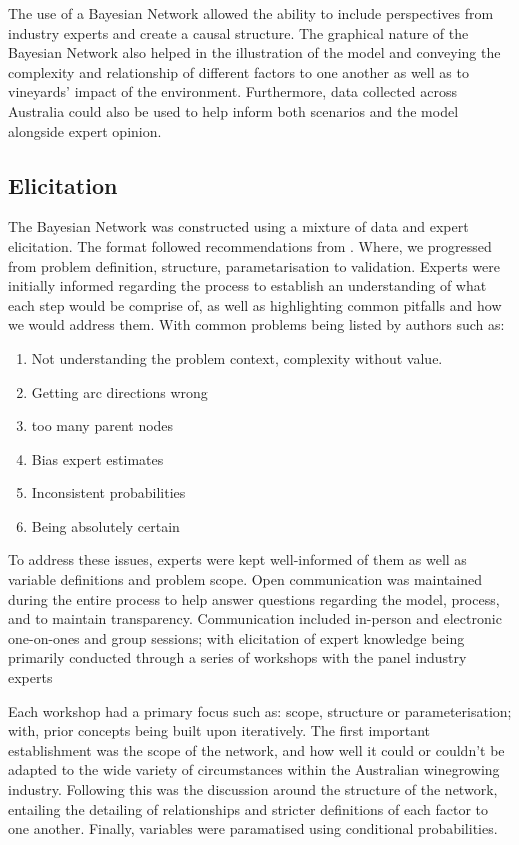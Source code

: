 The use of a Bayesian Network allowed the ability to include perspectives from industry experts and create a causal structure. The graphical nature of the Bayesian Network also helped in the illustration of the model and conveying the complexity and relationship of different factors to one another as well as to vineyards' impact of the environment. Furthermore, data collected across Australia could also be used to help inform both scenarios and the model alongside expert opinion.

\subsection{Elicitation}

The Bayesian Network was constructed using a mixture of data and expert elicitation. The format followed recommendations from \cite{korbBayesianArtificialIntelligence2011,pitchforthProposedValidationFramework2013}. Where, we progressed from problem definition, structure, parametarisation to validation. Experts were initially informed regarding the process to establish an understanding of what each step would be comprise of, as well as highlighting common pitfalls and how we would address them. With common problems being listed by authors such as:
\begin{enumerate}
        \item Not understanding the problem context, complexity without value.
        \item Getting arc directions wrong
        \item too many parent nodes
        \item Bias expert estimates
        \item Inconsistent probabilities
        \item Being absolutely certain
\end{enumerate}
To address these issues, experts were kept well-informed of them as well as variable definitions and problem scope. Open communication was maintained during the entire process to help answer questions regarding the model, process, and to maintain transparency. Communication included in-person and electronic one-on-ones and group sessions; with elicitation of expert knowledge being primarily conducted through a series of workshops with the panel industry experts

Each workshop had a primary focus such as: scope, structure or parameterisation; with, prior concepts being built upon iteratively. The first important establishment was the scope of the network, and how well it could or couldn't be adapted to the wide variety of circumstances within the Australian winegrowing industry. Following this was the discussion around the structure of the network, entailing the detailing of relationships and stricter definitions of each factor to one another. Finally, variables were paramatised using conditional probabilities.

